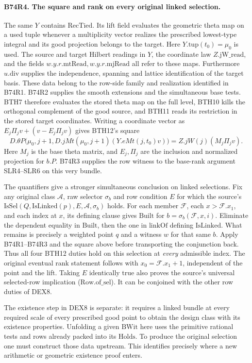 \paragraph{B74R4. The square and rank on every original linked selection.}
The same $Y$ contains $\mathrm{RecTied}$. Its lift field evaluates
the geometric theta map on a used tuple whenever a multiplicity
vector realizes the prescribed lowest-type integral and its good
projection belongs to the target. Here $Y.\mathrm{tup}(t_0)=\mu_0$
is used. The source and target Hilbert readings in $Y$, the coordinate
law $Z.\mathrm{jW\_read}$, and the fields
$w.y.r.\mathrm{mtRead},w.y.r.\mathrm{mjRead}$ all refer to these maps.
Furthermore $u.\mathrm{div}$ supplies the independence, spanning
and lattice identification of the target basis. These data belong to
the row-side family and realization identified in B74R1.
B74R2 supplies the smooth extensions and the simultaneous base
tests. BTH7 therefore evaluates the stored theta map on the full
level, BTH10 kills the orthogonal complement of the good source,
and BTH11 reads its restriction in the stored target coordinates.
Writing a coordinate vector as $E_j\Pi_jv+(v-E_j\Pi_jv)$ gives
BTH12's square
\[
 D.\theta P\bigl(\mu_0,j+1,D.jMt(\mu_0,j+1)(Y.eMt(j,t_0)v)\bigr)
       =Z.jW(j)(M_j\Pi_jv).
\]
Here $M_j$ is the base theta matrix, and $E_j,\Pi_j$ are the
inclusion and normalized projection for $b.P$. B74R3 supplies the
row witness to the base-rank argument SLR4--SLR6 on this very bundle.

The quantifiers give a stronger simultaneous conclusion on linked
selections. Fix any original class $\mathcal A$, raw selector $\sigma_b$
and row condition $E$ for which the source's
$\mathrm{IsSel}(Q,\mathrm{IsLinked}(p),E,\mathcal A,\sigma_b)$
holds. For each member $\mathcal F$, each $x>\mathcal F.x_1$,
and each index at $x$, its defining clause gives
$\mathrm{Built}$ for $b=\sigma_b(\mathcal F,x,i)$.
Eliminate the dependent equality in $\mathrm{Built}$, then the one
in $\mathrm{linkOf}$ defining $\mathrm{IsLinked}$. What remains
is precisely a weighted point $q$ and a witness $w$ for that
same $b$. Apply B74R1--B74R3 and the square above before transporting
the conjunction back. Thus all four BTH12 duties hold on this
selection at \emph{every} admissible index. The original eventual
rank statement follows with $x_0=\mathcal F.x_1+1$, independent of
the point and the lift. Taking $E$ identically true also proves the
source's universal selected-row implication ($\mathrm{Row.of\_sel}$).
It can be conjoined with the other row duties of DEX8.

The existence step in DEX8 is separate: it requires a linked bundle
at every required scale of every prescribed good point to obtain
the design class with its existence properties. Unfolding a given
$\mathrm{BWit}$ here uses the primitive rational tests and rows
already packed into its $\mathrm{Holds}$. To produce the original
selection one must construct those data upstream. This identifies
precisely where a new arithmetic or geometric existence proof enters.
